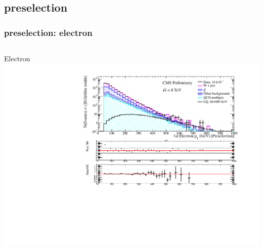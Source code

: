 \documentclass[bigger]{beamer}
\begin{document}
\subsection{\enujj preselection}
\label{sec-1-2}
\begin{frame}
\frametitle{\enujj preselection: electron \pt}
\label{sec-1-2-1}
\begin{columns}
\begin{column}{0.6\textwidth}
\label{sec-1-2-1-1}

\centering
Electron \pt
\includegraphics[width=\textwidth]{fig/enu/preselection/Pt1stEle_PAS_enujj.pdf}
\end{column}
\end{columns}
\end{frame}
\end{document}
